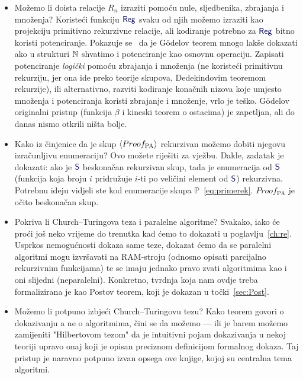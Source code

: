 \begin{itemize}
    \item Možemo li doista relacije $R_n$ izraziti pomoću nule, sljedbenika, zbrajanja i mno\-že\-nja? Koristeći funkciju $\f{Reg}$ svaku od njih možemo izraziti kao projekciju primitivno rekurzivne relacije, ali kodiranje potrebno za $\f{Reg}$ bitno koristi potenciranje. Pokazuje se~\cite{smullyan} da je Gödelov teorem mnogo lakše dokazati ako u strukturi ${\mathbb N}$ shvatimo i potenciranje kao osnovnu operaciju. Zapisati potenciranje \emph{logički} pomoću zbrajanja i množenja (ne koristeći primitivnu rekurziju, jer ona ide preko teorije skupova, Dedekindovim teoremom rekurzije), ili alternativno, razviti kodiranje konačnih nizova koje umjesto množenja i potenciranja koristi zbrajanje i množenje, vrlo je teško. Gödelov originalni pristup (funkcija $\beta$ i kineski teorem o ostacima) je zapetljan, ali do danas nismo otkrili ništa bolje.
    \item Kako iz činjenice da je skup $\langle Proof_{\text{PA}}\rangle$ rekurzivan možemo dobiti njegovu iz\-ra\-čun\-lji\-vu enumeraciju? Ovo možete riješiti za vježbu. Dakle, zadatak je dokazati: ako je $\f S$ beskonačan rekurzivan skup, tada je enumeracija od $\f S$ (funkcija koja broju $i$ pridružuje $i$-ti po veličini element od $\f S$) rekurzivna. Potrebnu ideju vidjeli ste kod enumeracije skupa $\mathbb P$~\eqref{eq:primerek}. $Proof_{\text{PA}}$ je očito beskonačan skup.
    \item Pokriva li Church--\!Turingova teza i paralelne algoritme? Svakako, iako će proći još neko vrijeme do trenutka kad ćemo to dokazati u poglavlju~\ref{ch:re}. Usprkos nemogućnosti dokaza same teze, dokazat ćemo da se paralelni algoritmi mogu izvršavati na RAM-stroju (odnosno opisati parcijalno rekurzivnim funkcijama) te se imaju jednako pravo zvati algoritmima kao i oni slijedni (neparalelni). Konkretno, tvrdnja koja nam ovdje treba formalizirana je kao Postov teorem, koji je dokazan u točki~\ref{sec:Post}.
    \item Možemo li potpuno izbjeći Church--\!Turingovu tezu? Kako teorem govori o dokazivanju a ne o algoritmima, čini se da možemo --- ili je barem možemo zamijeniti "Hilbertovom tezom" da je intuitivni pojam dokazivanja u nekoj teoriji upravo onaj koji je opisan preciznom definicijom formalnog dokaza. Taj pristup je naravno potpuno izvan opsega ove knjige, kojoj su centralna tema algoritmi.

\end{itemize}
